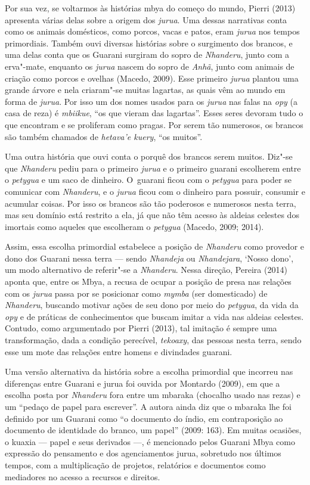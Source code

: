 Por sua vez, se voltarmos às histórias mbya do começo do mundo, Pierri
(2013) apresenta várias delas sobre a origem dos \emph{jurua}. Uma dessas
narrativas conta como os animais domésticos, como porcos, vacas e
patos, eram \emph{jurua} nos tempos primordiais. Também ouvi diversas
histórias sobre o surgimento dos brancos, e uma delas conta que os
Guarani surgiram do sopro de \emph{Nhanderu}, junto com a erva"-mate, enquanto
os \emph{jurua} nascem do sopro de \emph{Anhã}, junto com animais de criação como
porcos e ovelhas (Macedo, 2009). Esse primeiro \emph{jurua} plantou uma grande
árvore e nela criaram"-se muitas lagartas, as quais vêm ao mundo em
forma de \emph{jurua}. Por isso um dos nomes usados para os \emph{jurua} nas falas na
\emph{opy} (a casa de reza) é \emph{mbiikue}, ``os que vieram das lagartas''. Esses
seres devoram tudo o que encontram e se proliferam como pragas. Por
serem tão numerosos, os brancos são também chamados de \emph{hetava’e kuery},
``os muitos''.

Uma outra história que ouvi conta o porquê dos brancos serem muitos.
Diz"-se que \emph{Nhanderu} pediu para o primeiro \emph{jurua} e o primeiro guarani
escolherem entre o \emph{petygua} e um saco de dinheiro. O~guarani ficou
com o \emph{petygua} para poder se comunicar com \emph{Nhanderu}, e o \emph{jurua} ficou
com o dinheiro para possuir, consumir e acumular coisas. Por isso os
brancos são tão poderosos e numerosos nesta terra, mas seu domínio está
restrito a ela, já que não têm acesso às aldeias celestes dos imortais
como aqueles que escolheram o \emph{petygua} (Macedo, 2009; 2014). 

Assim, essa escolha primordial estabelece a posição de \emph{Nhanderu} como
provedor e dono dos Guarani nessa terra --- sendo \emph{Nhandeja} ou \emph{Nhandejara},
‘Nosso dono’, um modo alternativo de referir"-se a \emph{Nhanderu}. Nessa
direção, Pereira (2014) aponta que, entre os Mbya, a recusa de ocupar a
posição de presa nas relações com os \emph{jurua} passa por se posicionar como
\emph{mymba} (ser domesticado) de \emph{Nhanderu}, buscando motivar ações de seu dono
por meio do \emph{petygua}, da vida da \emph{opy} e de práticas de conhecimentos
que buscam imitar a vida nas aldeias celestes. Contudo, como
argumentado por Pierri (2013), tal imitação é sempre uma transformação,
dada a condição perecível, \emph{tekoaxy}, das pessoas nesta terra, sendo esse
um mote das relações entre homens e divindades guarani.


Uma versão alternativa da história sobre a escolha primordial que
incorreu nas diferenças entre Guarani e jurua foi ouvida por Montardo
(2009), em que a escolha posta por \emph{Nhanderu} fora entre um mbaraka
(chocalho usado nas rezas) e um ``pedaço de papel para escrever''. A
autora ainda diz que o mbaraka lhe foi definido por um Guarani como ``o
documento do índio, em contraposição ao documento de identidade do
branco, um papel'' (2009: 163). Em muitas ocasiões, o kuaxia --- papel e
seus derivados ---, é mencionado pelos Guarani Mbya como expressão do
pensamento e dos agenciamentos jurua, sobretudo nos últimos tempos, com
a multiplicação de projetos, relatórios e documentos como mediadores no
acesso a recursos e direitos.

